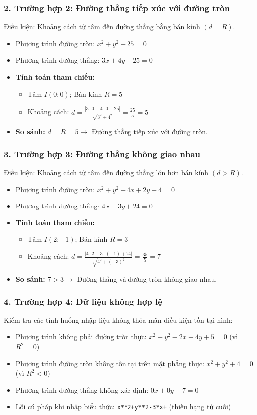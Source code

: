 \documentclass[12pt,a4paper]{article}
\begin{document}
\subsubsection*{2. Trường hợp 2: Đường thẳng tiếp xúc với đường tròn}
Điều kiện: Khoảng cách từ tâm đến đường thẳng bằng bán kính $(d = R)$.
\begin{itemize}
    \item Phương trình đường tròn: $x^{2}+y^{2}-25=0$
    \item Phương trình đường thẳng: $3x+4y-25=0$
    \item \textbf{Tính toán tham chiếu:}
    \begin{itemize}
        \item Tâm $I(0;0)$; Bán kính $R=5$
        \item Khoảng cách: $d = \frac{|3\cdot0 + 4\cdot0 - 25|}{\sqrt{3^{2} + 4^{2}}} = \frac{25}{5} = 5$
    \end{itemize}
    \item \textbf{So sánh:} $d = R = 5 \rightarrow$ Đường thẳng tiếp xúc với đường tròn.
\end{itemize}

\subsubsection*{3. Trường hợp 3: Đường thẳng không giao nhau}
Điều kiện: Khoảng cách từ tâm đến đường thẳng lớn hơn bán kính $(d > R)$.
\begin{itemize}
    \item Phương trình đường tròn: $x^{2}+y^{2}-4x+2y-4=0$
    \item Phương trình đường thẳng: $4x-3y+24=0$
    \item \textbf{Tính toán tham chiếu:}
    \begin{itemize}
        \item Tâm $I(2;-1)$; Bán kính $R=3$
        \item Khoảng cách: $d = \frac{|4\cdot2 - 3\cdot(-1) + 24|}{\sqrt{4^{2} + (-3)^{2}}} = \frac{35}{5} = 7$
    \end{itemize}
    \item \textbf{So sánh:} $7 > 3 \rightarrow$ Đường thẳng và đường tròn không giao nhau.
\end{itemize}

\subsubsection*{4. Trường hợp 4: Dữ liệu không hợp lệ}
Kiểm tra các tình huống nhập liệu không thỏa mãn điều kiện tồn tại hình:
\begin{itemize}
    \item Phương trình không phải đường tròn thực: $x^{2}+y^{2}-2x-4y+5=0$ (vì $R^{2}=0$)
    \item Phương trình đường tròn không tồn tại trên mặt phẳng thực: $x^{2}+y^{2}+4=0$ (vì $R^{2}<0$)
    \item Phương trình đường thẳng không xác định: $0x+0y+7=0$
    \item Lỗi cú pháp khi nhập biểu thức: \texttt{x**2+y**2-3*x+} (thiếu hạng tử cuối)
\end{itemize}
\end{document}
